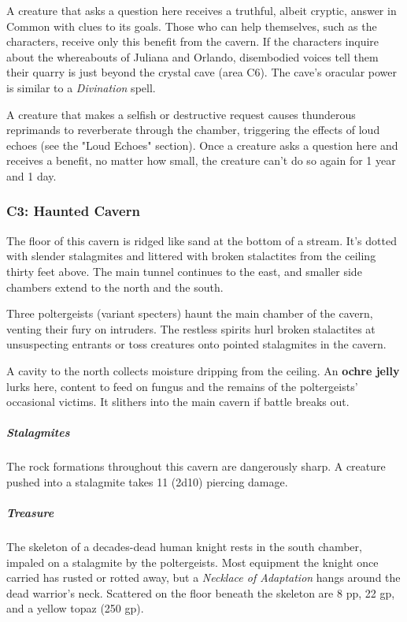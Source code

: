 \documentclass[10pt,a4paper,twoside,bg=print,twocolumn,openany,nodeprecatedcode]{dndbook}
\begin{document}
A creature that asks a question here receives a truthful, albeit cryptic, answer in Common with clues to its goals. Those who can help themselves, such as the characters, receive only this benefit from the cavern. If the characters inquire about the whereabouts of Juliana and Orlando, disembodied voices tell them their quarry is just beyond the crystal cave (area C6). The cave's oracular power is similar to a \textit{Divination} spell.

A creature that makes a selfish or destructive request causes thunderous reprimands to reverberate through the chamber, triggering the effects of loud echoes (see the "Loud Echoes" section). Once a creature asks a question here and receives a benefit, no matter how small, the creature can't do so again for 1 year and 1 day.

\subsubsection{C3: Haunted Cavern}
\begin{DndReadAloud}{}
The floor of this cavern is ridged like sand at the bottom of a stream. It's dotted with slender stalagmites and littered with broken stalactites from the ceiling thirty feet above. The main tunnel continues to the east, and smaller side chambers extend to the north and the south.

\end{DndReadAloud}

Three poltergeists (variant specters) haunt the main chamber of the cavern, venting their fury on intruders. The restless spirits hurl broken stalactites at unsuspecting entrants or toss creatures onto pointed stalagmites in the cavern.

A cavity to the north collects moisture dripping from the ceiling. An \textbf{ochre jelly} lurks here, content to feed on fungus and the remains of the poltergeists' occasional victims. It slithers into the main cavern if battle breaks out.

\subparagraph{Stalagmites}
The rock formations throughout this cavern are dangerously sharp. A creature pushed into a stalagmite takes 11 (2d10) piercing damage.

\subparagraph{Treasure}
The skeleton of a decades-dead human knight rests in the south chamber, impaled on a stalagmite by the poltergeists. Most equipment the knight once carried has rusted or rotted away, but a \textit{Necklace of Adaptation} hangs around the dead warrior's neck. Scattered on the floor beneath the skeleton are 8 pp, 22 gp, and a yellow topaz (250 gp).
\end{document}
